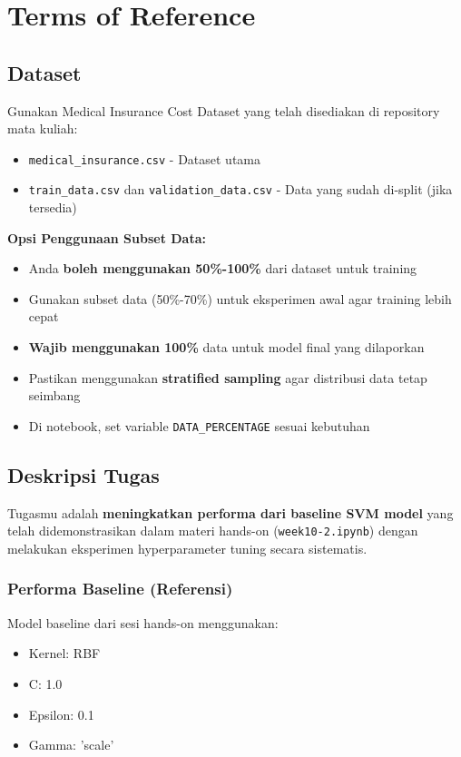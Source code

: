 \documentclass[12pt,a4paper]{article}
\begin{document}
\section{Terms of Reference}

\subsection{Dataset}
Gunakan Medical Insurance Cost Dataset yang telah disediakan di repository mata kuliah:
\begin{itemize}
    \item \texttt{medical\_insurance.csv} - Dataset utama
    \item \texttt{train\_data.csv} dan \texttt{validation\_data.csv} - Data yang sudah di-split (jika tersedia)
\end{itemize}

\textbf{Opsi Penggunaan Subset Data:}
\begin{itemize}
    \item Anda \textbf{boleh menggunakan 50\%-100\%} dari dataset untuk training
    \item Gunakan subset data (50\%-70\%) untuk eksperimen awal agar training lebih cepat
    \item \textbf{Wajib menggunakan 100\%} data untuk model final yang dilaporkan
    \item Pastikan menggunakan \textbf{stratified sampling} agar distribusi data tetap seimbang
    \item Di notebook, set variable \texttt{DATA\_PERCENTAGE} sesuai kebutuhan
\end{itemize}

\subsection{Deskripsi Tugas}

Tugasmu adalah \textbf{meningkatkan performa dari baseline SVM model} yang telah didemonstrasikan dalam materi hands-on (\texttt{week10-2.ipynb}) dengan melakukan eksperimen hyperparameter tuning secara sistematis.

\subsubsection{Performa Baseline (Referensi)}
Model baseline dari sesi hands-on menggunakan:
\begin{itemize}
    \item Kernel: RBF
    \item C: 1.0
    \item Epsilon: 0.1
    \item Gamma: 'scale'
\end{itemize}
\end{document}
